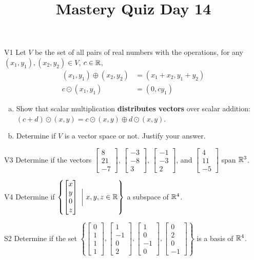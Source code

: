 \documentclass{sbgLAquiz}
\title{Mastery Quiz Day 14 }
\begin{document}
\begin{problem}{V1}
Let $V$ be the set of all pairs of real numbers with the operations, for any $(x_1,y_1), (x_2,y_2) \in V$, $c \in \mathbb{R}$,
\begin{align*}
(x_1,y_1) \oplus (x_2,y_2) &= (x_1+x_2,y_1+y_2) \\
c \odot (x_1,y_1) &= (0, cy_1)
\end{align*}
\begin{enumerate}[(a)]
\item Show that scalar multiplication
      \textbf{distributes vectors} over scalar addition:
      \((c+d)\odot(x,y)=
      c\odot(x,y) \oplus d\odot(x,y)\).
\item Determine if $V$ is a vector space or not.  Justify your answer.
\end{enumerate}
\end{problem}

\begin{problem}{V3}
Determine if the vectors  $\begin{bmatrix} 8 \\ 21 \\ -7 \end{bmatrix}$, $\begin{bmatrix} -3 \\ -8 \\ 3 \end{bmatrix}$, $\begin{bmatrix} -1 \\ -3 \\ 2 \end{bmatrix}$, and $\begin{bmatrix} 4 \\ 11 \\ -5 \end{bmatrix}$ span $\mathbb{R}^3$.
\end{problem}
\newpage

\begin{problem}{V4}
Determine if $\left\{ \begin{bmatrix} x \\ y \\ 0 \\ z \end{bmatrix}\  \bigg|\ x,y,z \in \mathbb{R}\right\}$  a subspace of $\mathbb{R}^4$.
\end{problem}

\begin{problem}{S2}
Determine if the set $\left\{ \begin{bmatrix} 0 \\ 1 \\ 1 \\ 1 \end{bmatrix}, \begin{bmatrix} 1 \\ -1 \\ 0 \\ 2 \end{bmatrix}, \begin{bmatrix} 1 \\ 0 \\ -1 \\ 0 \end{bmatrix}, \begin{bmatrix}0 \\ 2 \\ 0 \\ -1 \end{bmatrix} \right\}$ is a basis of $\mathbb{R}^4$.
\end{problem}
\end{document}
